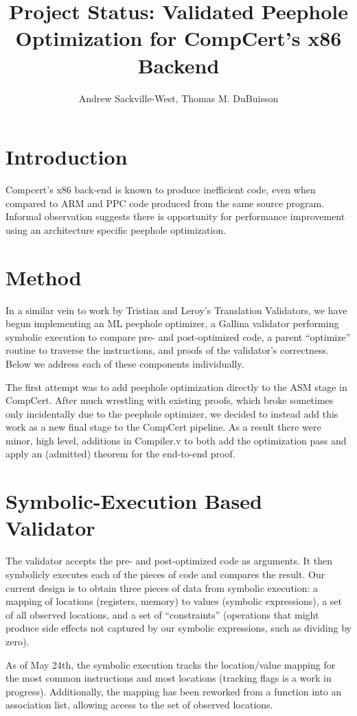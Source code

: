 \documentclass{article}
\title{Project Status: Validated Peephole Optimization for CompCert's x86 Backend}
\author{Andrew Sackville-West, Thomas M. DuBuisson}
\begin{document}
\maketitle

\section{Introduction}

Compcert's x86 back-end is known to produce inefficient code, even
when compared to ARM and PPC code produced from the same source
program.  Informal observation suggests there is opportunity for
performance improvement using an architecture specific peephole
optimization.

\section{Method}
In a similar vein to work by Tristian and Leroy's Translation
Validators, we have begun implementing an ML peephole optimizer, a
Gallina validator performing symbolic execution to compare pre- and
post-optimized code, a parent ``optimize'' routine to traverse the
instructions, and proofs of the validator's correctness.  Below we
address each of these components individually.

The first attempt was to add peephole optimization directly to the ASM
stage in CompCert.  After much wrestling with existing proofs, which
broke sometimes only incidentally due to the peephole optimizer, we
decided to instead add this work as a new final stage to the CompCert
pipeline.  As a result there were minor, high level, additions in
Compiler.v to both add the optimization pass and apply an (admitted)
theorem for the end-to-end proof.

\section{Symbolic-Execution Based Validator}
The validator accepts the pre- and post-optimized code as arguments.
It then symbolicly executes each of the pieces of code and compares
the result.  Our current design is to obtain three pieces of data from
symbolic execution: a mapping of locations (registers, memory) to
values (symbolic expressions), a set of all observed locations, and a
set of ``constraints'' (operations that might produce side effects not
captured by our symbolic expressions, such as dividing by zero).

As of May 24th, the symbolic execution tracks the location/value
mapping for the most common instructions and most locations (tracking
flags is a work in progress).  Additionally, the mapping has been
reworked from a function into an association list, allowing access to
the set of observed locations.
\end{document}
